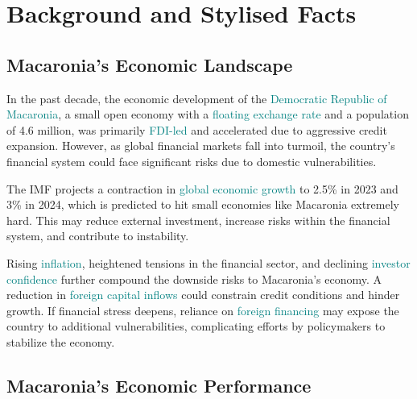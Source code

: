 
\section*{Background and Stylised Facts}



\subsection*{Macaronia's Economic Landscape}


In the past decade, the economic development of the \textcolor{teal}{Democratic Republic of Macaronia}, a 
small open economy with a \textcolor{teal}{floating exchange rate} and a population of 4.6 million, was
primarily \textcolor{teal}{FDI-led} and accelerated due to aggressive credit expansion. However, as global 
financial markets fall into turmoil, the country's financial system could face significant risks due to 
domestic vulnerabilities. 

The IMF projects a contraction in \textcolor{teal}{global economic growth} to 2.5\% in 2023 and
3\% in 2024, which is predicted to hit small economies like Macaronia extremely hard.
This  may reduce external investment, increase risks within the financial system, and
 contribute to instability.

Rising \textcolor{teal}{inflation}, heightened tensions in the financial sector, and declining 
\textcolor{teal}{investor confidence} further compound the downside risks to Macaronia’s economy.
A reduction in \textcolor{teal}{foreign capital inflows} could constrain credit conditions and hinder growth. 
If financial stress deepens, reliance on \textcolor{teal}{foreign financing} may expose the country to additional
vulnerabilities, complicating efforts by policymakers to stabilize the economy.

\subsection*{Macaronia's Economic Performance}


